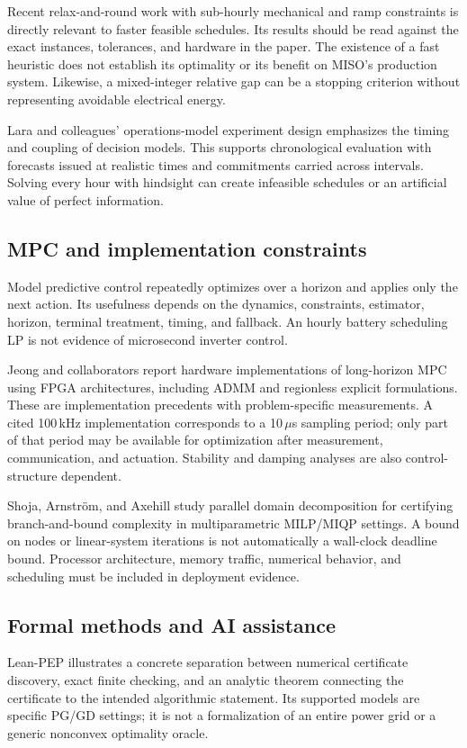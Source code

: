 \documentclass[11pt,letterpaper]{article}
\begin{document}
Recent relax-and-round work with sub-hourly mechanical and ramp constraints is directly relevant to faster feasible schedules.\cite{round} Its results should be read against the exact instances, tolerances, and hardware in the paper. The existence of a fast heuristic does not establish its optimality or its benefit on MISO's production system. Likewise, a mixed-integer relative gap can be a stopping criterion without representing avoidable electrical energy.

Lara and colleagues' operations-model experiment design emphasizes the timing and coupling of decision models.\cite{experiment} This supports chronological evaluation with forecasts issued at realistic times and commitments carried across intervals. Solving every hour with hindsight can create infeasible schedules or an artificial value of perfect information.

\subsection{MPC and implementation constraints}
Model predictive control repeatedly optimizes over a horizon and applies only the next action. Its usefulness depends on the dynamics, constraints, estimator, horizon, terminal treatment, timing, and fallback. An hourly battery scheduling LP is not evidence of microsecond inverter control.

Jeong and collaborators report hardware implementations of long-horizon MPC using FPGA architectures, including ADMM and regionless explicit formulations.\cite{mpc,mpc2} These are implementation precedents with problem-specific measurements. A cited 100\,kHz implementation corresponds to a 10\,$\mu$s sampling period; only part of that period may be available for optimization after measurement, communication, and actuation. Stability and damping analyses are also control-structure dependent.\cite{mpcdamp}

Shoja, Arnstr\"om, and Axehill study parallel domain decomposition for certifying branch-and-bound complexity in multiparametric MILP/MIQP settings.\cite{complexity} A bound on nodes or linear-system iterations is not automatically a wall-clock deadline bound. Processor architecture, memory traffic, numerical behavior, and scheduling must be included in deployment evidence.

\subsection{Formal methods and AI assistance}
Lean-PEP illustrates a concrete separation between numerical certificate discovery, exact finite checking, and an analytic theorem connecting the certificate to the intended algorithmic statement. Its supported models are specific PG/GD settings; it is not a formalization of an entire power grid or a generic nonconvex optimality oracle.\cite{leanpep}
\end{document}
